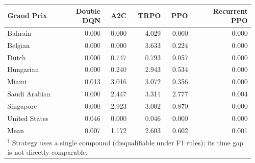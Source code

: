 \begin{tabular}{lrrrrr}
\toprule
Grand Prix & Double DQN & A2C & TRPO & PPO & Recurrent PPO \\
\midrule
Bahrain & 0.000 & 0.000 & 4.029 & 0.000 & 0.000 \\
Belgian & 0.000 & 0.000 & 3.633 & 0.224 & 0.000 \\
Dutch & 0.000 & 0.747 & 0.793 & 0.057 & 0.000 \\
Hungarian & 0.000 & 0.240 & 2.943 & 0.534 & 0.000 \\
Miami & 0.013 & 3.016 & 3.072 & 0.356 & 0.000 \\
Saudi Arabian & 0.000 & 2.447 & 3.311 & 2.777 & 0.004 \\
Singapore & 0.000 & 2.923 & 3.002 & 0.870 & 0.000 \\
United States & 0.046 & 0.000 & 0.046 & 0.000 & 0.000 \\
\midrule
Mean & 0.007 & 1.172 & 2.603 & 0.602 & 0.001 \\
\bottomrule
\multicolumn{6}{l}{\footnotesize $^\dagger$ Strategy uses a single compound (disqualifiable under F1 rules); its time gap is not directly comparable.} \\
\end{tabular}
